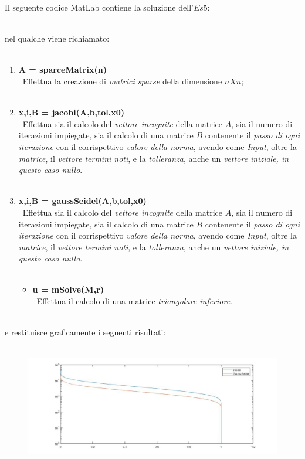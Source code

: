 Il seguente codice MatLab contiene la soluzione dell'$Es 5$:\\\
	
nel qualche viene richiamato:\\\
	\begin{enumerate}
		\item \textbf{A = sparceMatrix(n)}\\\
			Effettua la creazione di \textit{matrici sparse} della dimensione $nXn$;\\\
		\item \textbf{x,i,B = jacobi(A,b,tol,x0)}\\\
			Effettua sia il calcolo del \textit{vettore incognite} della matrice $A$, sia il numero di iterazioni impiegate, sia il calcolo di una matrice $B$ contenente il \textit{passo di ogni iterazione} con il corrispettivo \textit{valore della norma}, avendo come \textit{Input}, oltre la \textit{matrice}, il \textit{vettore termini noti}, e la \textit{tolleranza}, anche un \textit{vettore iniziale, in questo caso nullo}.\\\
		\item \textbf{x,i,B = gaussSeidel(A,b,tol,x0)}\\\
			Effettua sia il calcolo del \textit{vettore incognite} della matrice $A$, sia il numero di iterazioni impiegate, sia il calcolo di una matrice $B$ contenente il \textit{passo di ogni iterazione} con il corrispettivo \textit{valore della norma}, avendo come \textit{Input}, oltre la 	\textit{matrice}, il \textit{vettore termini noti}, e la \textit{tolleranza}, anche un \textit{vettore iniziale, in questo caso nullo}.\\\
		\begin{itemize}
			\item \textbf{u = mSolve(M,r)}\\\
				Effettua il calcolo di una matrice \textit{triangolare inferiore}.\\\
		\end{itemize}
	\end{enumerate}
e restituisce graficamente i seguenti risultati:\\\
	\begin{figure}[H]
		\includegraphics[width=\textwidth]{Plot/Cap_6_Es_5}
	\end{figure}
